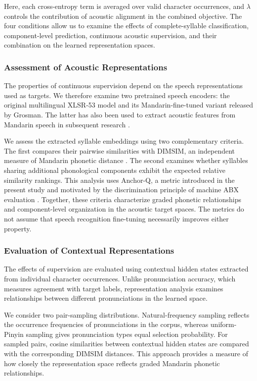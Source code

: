 Here, each cross-entropy term is averaged over valid character occurrences, and
$\lambda$ controls the contribution of acoustic alignment in the combined
objective. The four conditions allow us to examine the effects of
complete-syllable classification, component-level prediction, continuous
acoustic supervision, and their combination on the learned representation
spaces.

\subsubsection{Assessment of Acoustic Representations}
\label{sec:intro-acoustic-assessment}

The properties of continuous supervision depend on the speech representations
used as targets. We therefore examine two pretrained speech encoders: the
original multilingual XLSR-53 model and its Mandarin-fine-tuned variant released
by Grosman. The latter has also been used to extract acoustic features from
Mandarin speech in subsequent research \cite{ref_xlsr2021,ref_grosman2021,ref_liao2026}.

We assess the extracted syllable embeddings using two complementary criteria.
The first compares their pairwise similarities with DIMSIM, an independent
measure of Mandarin phonetic distance \cite{ref_dimsim}. The second examines
whether syllables sharing additional phonological components exhibit the
expected relative similarity rankings. This analysis uses Anchor-Q, a metric
introduced in the present study and motivated by the discrimination principle of
machine ABX evaluation \cite{ref_matusevych2023}. Together, these criteria
characterize graded phonetic relationships and component-level organization in
the acoustic target spaces. The metrics do not assume that speech recognition
fine-tuning necessarily improves either property.

\subsubsection{Evaluation of Contextual Representations}
\label{sec:intro-contextual-evaluation}

The effects of supervision are evaluated using contextual hidden states
extracted from individual character occurrences. Unlike pronunciation accuracy,
which measures agreement with target labels, representation analysis examines
relationships between different pronunciations in the learned space.

We consider two pair-sampling distributions. Natural-frequency sampling reflects
the occurrence frequencies of pronunciations in the corpus, whereas
uniform-Pinyin sampling gives pronunciation types equal selection probability.
For sampled pairs, cosine similarities between contextual hidden states are
compared with the corresponding DIMSIM distances. This approach provides a
measure of how closely the representation space reflects graded Mandarin
phonetic relationships.

